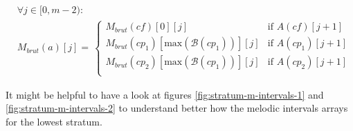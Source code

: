 \begin{equation}
    \begin{aligned}
        &\forall j \in [0, m-2):\\
        &M_{brut}(a)[j] = \,  
        \begin{cases}
            M_{brut}(cf)[0][j] & \text{if } A(cf)[j+1]\\
            M_{brut}(cp_1)[\text{max}(\mathcal{B}(cp_1))][j] & \text{if } A(cp_1)[j+1]\\
            M_{brut}(cp_2)[\text{max}(\mathcal{B}(cp_1))][j] & \text{if } A(cp_2)[j+1]\\
        \end{cases}
    \end{aligned}
\end{equation}

\noindent It might be helpful to have a look at figures \ref{fig:stratum-m-intervals-1} and \ref{fig:stratum-m-intervals-2} to understand better how the melodic intervals arrays for the lowest stratum.

